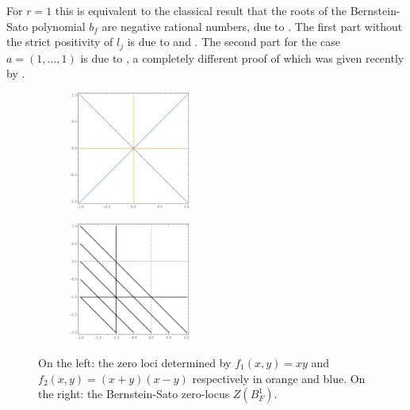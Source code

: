     For $r=1$ this is equivalent to the classical result that the roots of the Bernstein-Sato polynomial $b_f$ are negative rational numbers, due to \cite{kashiwara1976b}.
    The first part without the strict positivity of $l_j$ is due to \cite{sabbah1987proximite} and  \cite{gyoja1993bernstein}.
    The second part for the case $a=(1,\ldots,1)$ is due to \cite{maisonobe2016filtration}, a completely different proof of which was given recently by \cite{robin}.
    \begin{figure}
      \centering
      \begin{subfigure}{0.45\textwidth}
        \centering
        \includegraphics[width  = 4cm]{Figures/Hyperplane}
      \end{subfigure}
      \begin{subfigure}{0.45\textwidth}
        \centering
          \includegraphics[width = 4cm]{Figures/HyperplaneBS}
      \end{subfigure}
      \caption{On the left: the zero loci determined by $f_1(x,y) = xy$ and $f_2(x,y) = (x+y)(x-y)$ respectively in orange and blue.
      On the right: the
      Bernstein-Sato zero-locus $Z(B_F^1)$.}
      \label{figure: TwoCones}
    \end{figure}
